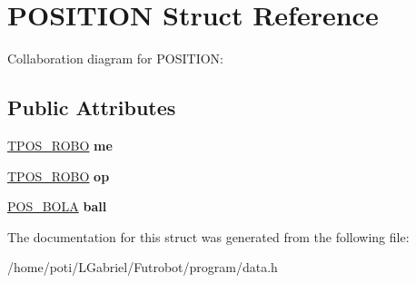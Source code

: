 \hypertarget{structPOSITION}{}\section{P\+O\+S\+I\+T\+I\+ON Struct Reference}
\label{structPOSITION}


Collaboration diagram for P\+O\+S\+I\+T\+I\+ON\+:
\subsection*{Public Attributes}
\begin{DoxyCompactItemize}
\item 
\hyperlink{structTPOS__ROBO}{T\+P\+O\+S\+\_\+\+R\+O\+BO} {\bfseries me}\hypertarget{structPOSITION_a6ec2570913bb54cc03092e170bd986de}{}\label{structPOSITION_a6ec2570913bb54cc03092e170bd986de}

\item 
\hyperlink{structTPOS__ROBO}{T\+P\+O\+S\+\_\+\+R\+O\+BO} {\bfseries op}\hypertarget{structPOSITION_aa1ec9d5357370b69a98e198ff4b6d13b}{}\label{structPOSITION_aa1ec9d5357370b69a98e198ff4b6d13b}

\item 
\hyperlink{structPOS__BOLA}{P\+O\+S\+\_\+\+B\+O\+LA} {\bfseries ball}\hypertarget{structPOSITION_a18a35ebc8aececa4724e085f20149f4c}{}\label{structPOSITION_a18a35ebc8aececa4724e085f20149f4c}

\end{DoxyCompactItemize}


The documentation for this struct was generated from the following file\+:\begin{DoxyCompactItemize}
\item 
/home/poti/\+L\+Gabriel/\+Futrobot/program/data.\+h\end{DoxyCompactItemize}
